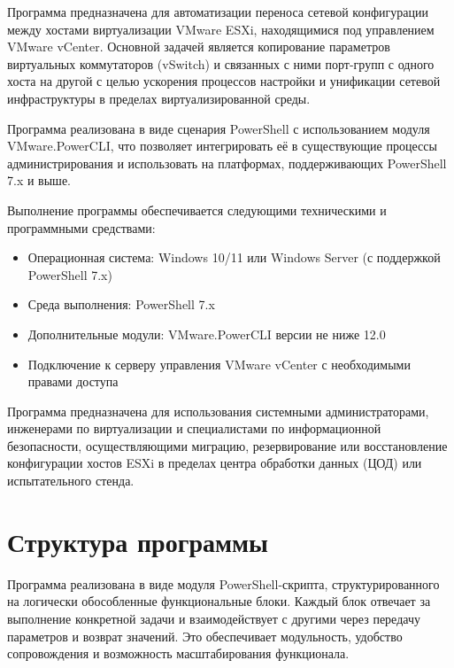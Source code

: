 Программа предназначена для автоматизации переноса сетевой конфигурации между хостами виртуализации VMware ESXi, находящимися под управлением VMware vCenter. Основной задачей является копирование параметров виртуальных коммутаторов (vSwitch) и связанных с ними порт-групп с одного хоста на другой с целью ускорения процессов настройки и унификации сетевой инфраструктуры в пределах виртуализированной среды.

Программа реализована в виде сценария PowerShell с использованием модуля VMware.PowerCLI, что позволяет интегрировать её в существующие процессы администрирования и использовать на платформах, поддерживающих PowerShell 7.x и выше.

Выполнение программы обеспечивается следующими техническими и программными средствами:
\begin{itemize}
  \item Операционная система: Windows 10/11 или Windows Server (с поддержкой PowerShell 7.x)
  \item Среда выполнения: PowerShell 7.x
  \item Дополнительные модули: VMware.PowerCLI версии не ниже 12.0
  \item Подключение к серверу управления VMware vCenter с необходимыми правами доступа
\end{itemize}

Программа предназначена для использования системными администраторами, инженерами по виртуализации и специалистами по информационной безопасности, осуществляющими миграцию, резервирование или восстановление конфигурации хостов ESXi в пределах центра обработки данных (ЦОД) или испытательного стенда.

\newpage
\section{Структура программы}

Программа реализована в виде модуля PowerShell-скрипта, структурированного на логически обособленные функциональные блоки. Каждый блок отвечает за выполнение конкретной задачи и взаимодействует с другими через передачу параметров и возврат значений. Это обеспечивает модульность, удобство сопровождения и возможность масштабирования функционала.


